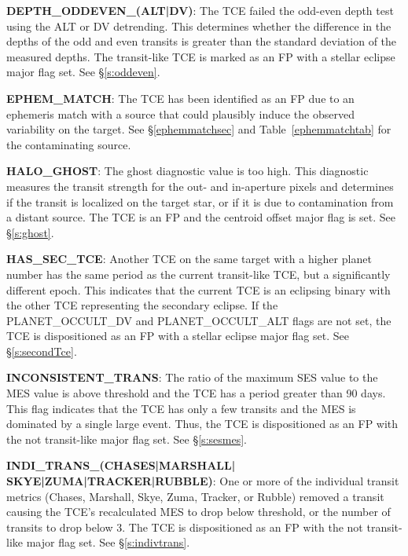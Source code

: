 \textbf{DEPTH\_ODDEVEN\_(ALT|DV)}: The TCE failed the odd-even depth test using the ALT or DV detrending. This determines whether the difference in the depths of the odd and even transits is greater than the standard deviation of the measured depths. The transit-like TCE is marked as an FP with a stellar eclipse major flag set. See \S\ref{s:oddeven}.


\textbf{EPHEM\_MATCH}: The TCE has been identified as an FP due to an ephemeris match with a source that could plausibly induce the observed variability on the target. See \S\ref{ephemmatchsec} and Table~\ref{ephemmatchtab} for the contaminating source.

\textbf{HALO\_GHOST}: The ghost diagnostic value is too high. This diagnostic measures the transit strength for the out- and in-aperture pixels and determines if the transit is localized on the target star, or if it is due to contamination from a distant source. The TCE is an FP and the centroid offset major flag is set. See \S\ref{s:ghost}.

\textbf{HAS\_SEC\_TCE}: Another TCE on the same target with a higher planet number has the same period as the current transit-like TCE, but a significantly different epoch. This indicates that the current TCE is an eclipsing binary with the other TCE representing the secondary eclipse. If the PLANET\_OCCULT\_DV and PLANET\_OCCULT\_ALT flags are not set, the TCE is dispositioned as an FP with a stellar eclipse major flag set. See \S\ref{s:secondTce}.

\textbf{INCONSISTENT\_TRANS}: The ratio of the maximum SES value to the MES value is above threshold and the TCE has a period greater than 90 days. This flag indicates that the TCE has only a few transits and the MES is dominated by a single large event. Thus, the TCE is dispositioned as an FP with the not transit-like major flag set. See \S\ref{s:sesmes}.

\textbf{INDI\_TRANS\_(CHASES|MARSHALL|\\SKYE|ZUMA|TRACKER|RUBBLE)}: One or more of the individual transit metrics (Chases, Marshall, Skye, Zuma, Tracker, or Rubble) removed a transit causing the TCE's recalculated MES to drop below threshold, or the number of transits to drop below 3. The TCE is dispositioned as an FP with the not transit-like major flag set. See \S\ref{s:indivtrans}.

